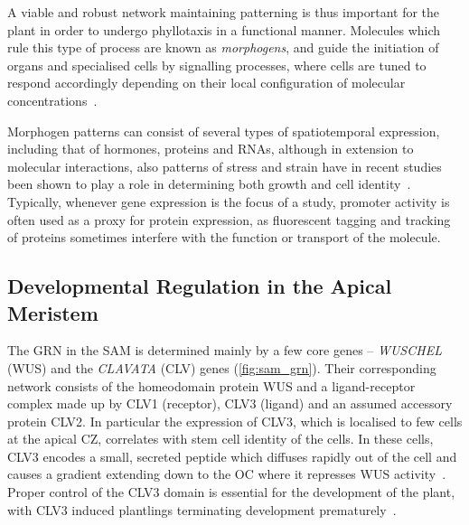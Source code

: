 A viable and robust network maintaining patterning is thus important for 
the plant in order to undergo phyllotaxis in a functional manner. Molecules
which rule this type of  
process are known as \textit{morphogens}, and guide the initiation of organs and
specialised cells by signalling processes, where cells are tuned to respond
accordingly depending on their local configuration of molecular
concentrations~\cite{lawrence1996morphogens}.

Morphogen patterns can consist of several
types of spatiotemporal expression, including that of hormones, proteins and
RNAs, although in extension to molecular interactions, also patterns
of stress and strain have in recent studies been shown to play a role in
determining both growth and cell
identity~\cite{Bozorg2016,hamant2008developmental}. Typically, whenever gene
expression is the focus of a study, promoter activity is often used as a proxy
for protein expression, as fluorescent tagging
and tracking of proteins sometimes interfere with the function or transport of
the molecule. 

\subsection{Developmental Regulation in the Apical Meristem} %
The GRN in the SAM is determined mainly by a few core genes -- \textit{WUSCHEL}
(WUS) and the \textit{CLAVATA} (CLV) genes (\cref{fig:sam_grn}). Their corresponding network consists of the homeodomain
protein WUS and a ligand-receptor complex made up by CLV1 (receptor), CLV3 (ligand) and
an assumed accessory protein CLV2. In particular the expression of CLV3, which
is localised to few cells at the apical CZ, correlates with stem cell identity of
the cells. In these cells, CLV3 encodes a small, secreted peptide which diffuses
rapidly out of the cell and causes a gradient extending down to the OC where it
represses WUS activity~\cite{clark2001cell}. Proper control of the CLV3 domain
is essential for the development of the plant, with CLV3 induced plantlings
terminating development prematurely~\cite{brand2002regulation}.

